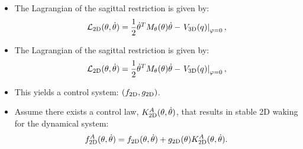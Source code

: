 \documentclass{beamer}
\begin{document}
{{\begin{itemize}
    \item The Lagrangian of the sagittal restriction is given by:
      \begin{align*}
        \mathcal{L}_\mathrm{2D}(\theta,\dot{\theta}) = \frac{1}{2} \dot{\theta}^T M_{\theta}(\theta) \dot{\theta} - \left.V_\mathrm{3D}(q_{})\right\vert_{\varphi=0},
      \end{align*}

    \end{itemize}
  }

   {
    \vspace{-.1cm}
    \begin{itemize}

    \item The Lagrangian of the sagittal restriction is given by:
      \begin{align*}
        \mathcal{L}_\mathrm{2D}(\theta,\dot{\theta}) = \frac{1}{2} \dot{\theta}^T M_{\theta}(\theta) \dot{\theta} - \left.V_\mathrm{3D}(q_{})\right\vert_{\varphi=0},
      \end{align*}

    \item This yields a control system: $(f_\mathrm{2D},g_\mathrm{2D})$.

    \item \alert{Assume} there exists a control law, $K_\mathrm{2D}^{A}(\theta,\dot{\theta})$, that results in stable 2D waking for the dynamical system:
      \begin{align*}
      f_\mathrm{2D}^{A}(\theta,\dot{\theta}) = f_\mathrm{2D}(\theta, \dot{\theta}) + g_\mathrm{2D}(\theta) K_\mathrm{2D}^{A}(\theta,\dot{\theta}).
      \end{align*}

    \end{itemize}
  }

%
}
\end{document}
